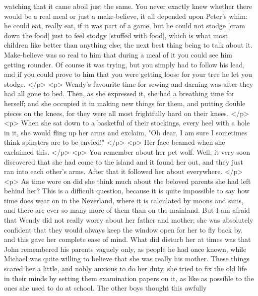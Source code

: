       watching that it came aboil just the same. You never exactly knew whether
      there would be a real meal or just a make-believe, it all depended upon
      Peter's whim: he could eat, really eat, if it was part of a game, but he
      could not stodge [cram down the food] just to feel stodgy [stuffed with
      food], which is what most children like better than anything else; the
      next best thing being to talk about it. Make-believe was so real to him
      that during a meal of it you could see him getting rounder. Of course it
      was trying, but you simply had to follow his lead, and if you could prove
      to him that you were getting loose for your tree he let you stodge.
    </p>
    <p>
      Wendy's favourite time for sewing and darning was after they had all gone
      to bed. Then, as she expressed it, she had a breathing time for herself;
      and she occupied it in making new things for them, and putting double
      pieces on the knees, for they were all most frightfully hard on their
      knees.
    </p>
    <p>
      When she sat down to a basketful of their stockings, every heel with a
      hole in it, she would fling up her arms and exclaim, "Oh dear, I am sure I
      sometimes think spinsters are to be envied!"
    </p>
    <p>
      Her face beamed when she exclaimed this.
    </p>
    <p>
      You remember about her pet wolf. Well, it very soon discovered that she
      had come to the island and it found her out, and they just ran into each
      other's arms. After that it followed her about everywhere.
    </p>
    <p>
      As time wore on did she think much about the beloved parents she had left
      behind her? This is a difficult question, because it is quite impossible
      to say how time does wear on in the Neverland, where it is calculated by
      moons and suns, and there are ever so many more of them than on the
      mainland. But I am afraid that Wendy did not really worry about her father
      and mother; she was absolutely confident that they would always keep the
      window open for her to fly back by, and this gave her complete ease of
      mind. What did disturb her at times was that John remembered his parents
      vaguely only, as people he had once known, while Michael was quite willing
      to believe that she was really his mother. These things scared her a
      little, and nobly anxious to do her duty, she tried to fix the old life in
      their minds by setting them examination papers on it, as like as possible
      to the ones she used to do at school. The other boys thought this awfully
